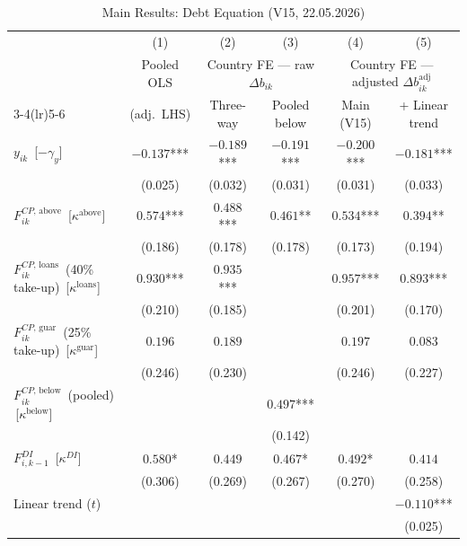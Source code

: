 \documentclass[12pt, a4paper]{article}
\begin{document}
\begin{table}[H]
\centering
\caption{Main Results: Debt Equation (V15, 22.05.2026)}
\label{tab:debt_main}
\scriptsize
\renewcommand{\arraystretch}{1.2}
\begin{tabular}{@{} l c c c c c @{}}
\toprule
 & (1) & (2) & (3) & (4) & (5) \\
 & Pooled OLS & \multicolumn{2}{c}{Country FE --- raw $\Delta b_{ik}$}
              & \multicolumn{2}{c}{Country FE --- adjusted $\Delta b^{\text{adj}}_{ik}$} \\
 \cmidrule(lr){3-4}\cmidrule(lr){5-6}
 & (adj.\ LHS) & Three-way & Pooled below & Main (V15) & + Linear trend \\
\midrule
$y_{ik}$ \,[$-\gamma_y$]
  & $-0.137$*** & $-0.189$*** & $-0.191$*** & $-0.200$*** & $-0.181$*** \\
  & (0.025)     & (0.032)     & (0.031)     & (0.031)     & (0.033) \\[4pt]
$F^{CP,\,\text{above}}_{ik}$ \,[$\kappa^{\text{above}}$]
  & $0.574$***  & $0.488$***  & $0.461$**   & $0.534$***  & $0.394$** \\
  & (0.186)     & (0.178)     & (0.178)     & (0.173)     & (0.194) \\[4pt]
$F^{CP,\,\text{loans}}_{ik}$ \,(40\% take-up) \,[$\kappa^{\text{loans}}$]
  & $0.930$***  & $0.935$***  &             & $0.957$***  & $0.893$*** \\
  & (0.210)     & (0.185)     &             & (0.201)     & (0.170) \\[4pt]
$F^{CP,\,\text{guar}}_{ik}$ \,(25\% take-up) \,[$\kappa^{\text{guar}}$]
  & $0.196$     & $0.189$     &             & $0.197$     & $0.083$ \\
  & (0.246)     & (0.230)     &             & (0.246)     & (0.227) \\[4pt]
$F^{CP,\,\text{below}}_{ik}$ \,(pooled) \,[$\kappa^{\text{below}}$]
  &             &             & $0.497$***  &             &  \\
  &             &             & (0.142)     &             &  \\[4pt]
$F^{DI}_{i,k-1}$ \,[$\kappa^{DI}$]
  & $0.580$*    & $0.449$     & $0.467$*    & $0.492$*    & $0.414$ \\
  & (0.306)     & (0.269)     & (0.267)     & (0.270)     & (0.258) \\[4pt]
Linear trend ($t$)
  &             &             &             &             & $-0.110$*** \\
  &             &             &             &             & (0.025) \\[4pt]

\end{tabular}
\end{table}
\end{document}
